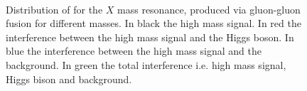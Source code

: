 \begin{figure}[htbp]
\centering
{}
\\
\caption{Distribution of for the $X$ mass resonance, produced via gluon-gluon fusion for different masses. In black the high mass signal. In red the interference between the high mass signal and the Higgs boson. In blue the interference between the high mass signal and the background. In green the total interference i.e. high 
mass signal, Higgs bison and background. }
    \label{fig:X300}
\end{figure}


